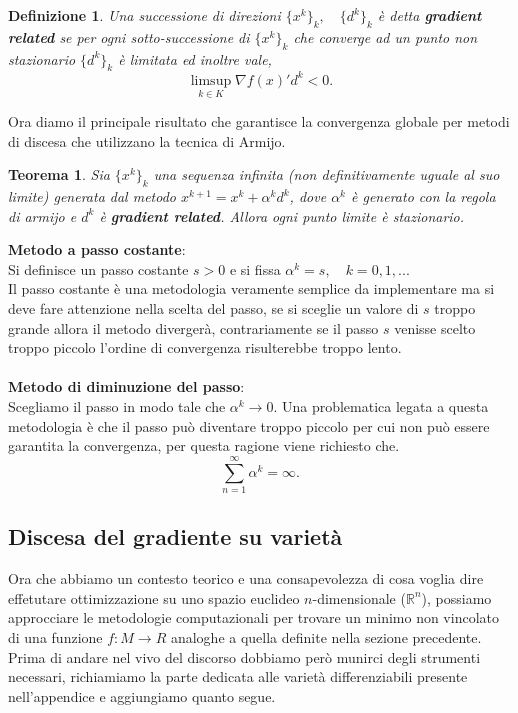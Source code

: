 \documentclass[a4paper, 12pt]{article}
\newtheorem{theorem}{Teorema}
\newtheorem{definition}{Definizione}
\begin{document}
\begin{definition}
Una successione di direzioni $\{x^k\}_k, \quad \{d^k\}_k$ è detta \textbf{gradient related} se per ogni sotto-successione di $\{x^k\}_k$ che converge ad un punto non stazionario $\{d^k\}_k$ è limitata ed inoltre vale,\\
\[\limsup\limits_{k \in K} \nabla f(x)'d^k < 0.\]
\end{definition}
Ora diamo il principale risultato che garantisce la convergenza globale per metodi di discesa che utilizzano la tecnica di Armijo.
\begin{theorem}
Sia $\{x^k\}_k$ una sequenza infinita (non definitivamente uguale al suo limite) generata dal metodo $x^{k+1} = x^k + \alpha^k d^k$, dove $\alpha^k$ è generato con la regola di armijo e $d^k$ è \textbf{gradient related}. Allora ogni punto limite è stazionario.
\end{theorem}
\textbf{Metodo a passo costante}:\\
Si definisce un passo costante $s > 0$ e si fissa $\alpha^k = s, \quad k = 0,1, ...$\\
Il passo costante è una metodologia veramente semplice da implementare ma si deve fare attenzione nella scelta del passo, se si sceglie un valore di $s$ troppo grande allora il metodo divergerà, contrariamente se il passo $s$ venisse scelto troppo piccolo l'ordine di convergenza risulterebbe troppo lento.\\\\
\textbf{Metodo di diminuzione del passo}:\\
Scegliamo il passo in modo tale che $\alpha^k \rightarrow 0$. Una problematica legata a questa metodologia è che il passo può diventare troppo piccolo per cui non può essere garantita la convergenza, per questa ragione viene richiesto che.\\ \[\sum_{n=1}^{\infty} \alpha^k = \infty.\]
\subsection{Discesa del gradiente su varietà} \label{riemanniangd}
Ora che abbiamo un contesto teorico e una consapevolezza di cosa voglia dire effetutare ottimizzazione su uno spazio euclideo $n$-dimensionale ($\mathbb{R}^n$), possiamo approcciare le metodologie computazionali per trovare un minimo non vincolato di una funzione $f:M \to R$ analoghe a quella definite nella sezione precedente. Prima di andare nel vivo del discorso dobbiamo però munirci degli strumenti necessari, richiamiamo la parte dedicata alle varietà differenziabili presente nell'appendice e aggiungiamo quanto segue.
\end{document}
